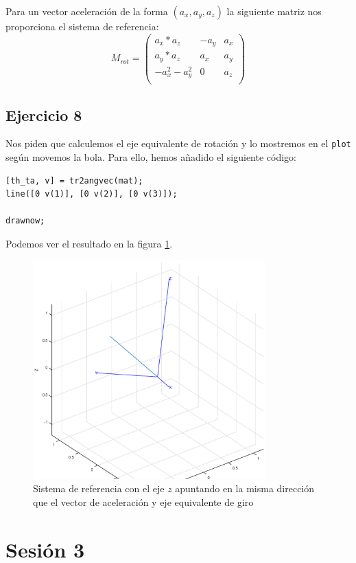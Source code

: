 \documentclass{article}
\let\oldsection\section
\renewcommand\section{\clearpage\oldsection}
\newcommand{\fref}[1]{figura \ref{fig:#1}}
\newcommand{\sej}[1]{\subsection{Ejercicio #1}}
\begin{document}
Para un vector aceleración de la forma $(a_x, a_y, a_z)$ la siguiente matriz nos proporciona el sistema de referencia: 
\[
M_{rot} = \left(
\begin{array}{ccc}
a_x*a_z        & -a_y & a_x  \\
a_y*a_z        & a_x  & a_y  \\
-a_x^2 - a_y^2 & 0    & a_z  \\
\end{array}
\right)
\]

\sej{8}

Nos piden que calculemos el eje equivalente de rotación y lo mostremos en el {\tt plot} según movemos la bola. Para ello, hemos añadido el siguiente código:

\begin{lstlisting}[frame=single]
[th_ta, v] = tr2angvec(mat);
line([0 v(1)], [0 v(2)], [0 v(3)]);

drawnow;
\end{lstlisting}

Podemos ver el resultado en la \fref{practica2_ex8}.

\begin{figure}[h]
\centering
\includegraphics[width=0.8\textwidth]{practica2_ex8.eps}
\caption{Sistema de referencia con el eje $z$ apuntando en la misma dirección que el vector de aceleración y eje equivalente de giro}
\label{fig:practica2_ex8}
\end{figure}


\section{Sesión 3}
\end{document}
